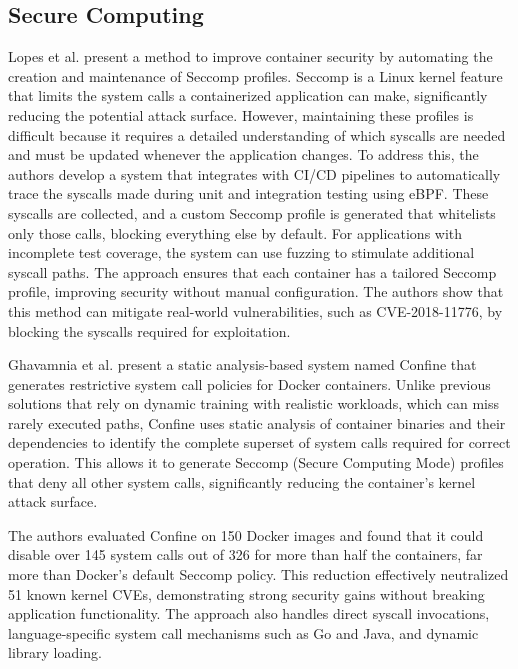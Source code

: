 \begin{doublespace}
\section{Secure Computing}

Lopes et al. \cite{lopes2020container} present a method to improve container security by automating the creation and maintenance of Seccomp profiles. Seccomp is a Linux kernel feature that limits the system calls a containerized application can make, significantly reducing the potential attack surface. However, maintaining these profiles is difficult because it requires a detailed understanding of which syscalls are needed and must be updated whenever the application changes. To address this, the authors develop a system that integrates with CI/CD pipelines to automatically trace the syscalls made during unit and integration testing using eBPF. These syscalls are collected, and a custom Seccomp profile is generated that whitelists only those calls, blocking everything else by default. For applications with incomplete test coverage, the system can use fuzzing to stimulate additional syscall paths. The approach ensures that each container has a tailored Seccomp profile, improving security without manual configuration. The authors show that this method can mitigate real-world vulnerabilities, such as CVE-2018-11776, by blocking the syscalls required for exploitation.

Ghavamnia et al. \cite{ghavamnia2020confine} present a static analysis-based system named Confine that generates restrictive system call policies for Docker containers. Unlike previous solutions that rely on dynamic training with realistic workloads, which can miss rarely executed paths, Confine uses static analysis of container binaries and their dependencies to identify the complete superset of system calls required for correct operation. This allows it to generate Seccomp (Secure Computing Mode) profiles that deny all other system calls, significantly reducing the container’s kernel attack surface.

The authors evaluated Confine on 150 Docker images and found that it could disable over 145 system calls out of 326 for more than half the containers, far more than Docker’s default Seccomp policy. This reduction effectively neutralized 51 known kernel CVEs, demonstrating strong security gains without breaking application functionality. The approach also handles direct syscall invocations, language-specific system call mechanisms such as Go and Java, and dynamic library loading.


\end{doublespace}
